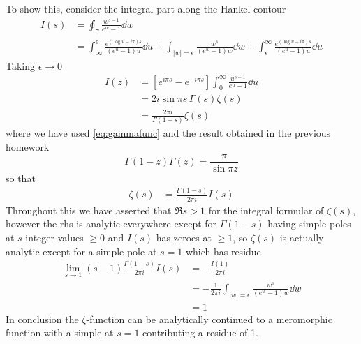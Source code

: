 \documentclass[a4paper,12pt]{article}
\begin{document}
To show this, consider the integral part along the Hankel contour 
\begin{equation}
	\begin{aligned}
		I(s)&=\oint_\gamma \frac{w^{s-1}}{e^{w}-1} \dd w\\
		&=\int_{\infty}^{\epsilon}\frac{e^{(\log u-i\pi)s}}{(e^{u}-1)u} \dd u+
		\int_{|w|=\epsilon} \frac{w^{s}}{(e^{w}-1)w} \dd w+\int^{\infty}_{\epsilon}\frac{e^{(\log u+i\pi)s}}{(e^{u}-1)u} \dd u
	\end{aligned}
\end{equation}
Taking $\epsilon\to 0$
\begin{equation}
	\begin{aligned}
		I(z)&=\left[e^{i\pi s}-e^{-i\pi s}\right]\int_0^\infty \frac{u^{s-1}}{e^{u}-1}\dd u\\
		&=2i\sin \pi s\, \Gamma(s)\zeta(s)\\
		&=\frac{2\pi i}{\Gamma(1-s)}\zeta(s)
	\end{aligned}
\end{equation}
where we have used \eqref{eq:gammafunc} and the result obtained in the previous homework
\begin{equation}
\Gamma(1-z)\Gamma(z)=\frac{\pi}{\sin \pi z}
\end{equation}
so that
\begin{equation}
	\begin{aligned}
		\zeta(s)&=\frac{\Gamma(1-s)}{2\pi i}I(s)
	\end{aligned}
\end{equation}
Throughout this we have asserted that $\Re s >1$ for the integral formular of $\zeta(s)$, however the rhs is analytic everywhere except for $\Gamma(1-s)$ having simple poles at $s$ integer values $\geq0$ and $I(s)$ has zeroes at $\geq1$, so $\zeta(s)$ is actually analytic except for a simple pole at $s=1$ which has residue
\begin{equation}
	\begin{aligned}
		\lim_{s\to 1}(s-1)\frac{\Gamma(1-s)}{2\pi i}I(s)&=-\frac{I(1)}{2\pi i}\\
		&=-\frac{1}{2\pi i}		\int_{|w|=\epsilon} \frac{w^{1}}{(e^{w}-1)w} \dd w\\
		&=1
	\end{aligned}
\end{equation}
In conclusion the $\zeta$-function can be analytically continued to a meromorphic function with a simple at $s=1$ contributing a residue of 1.
\end{document}
